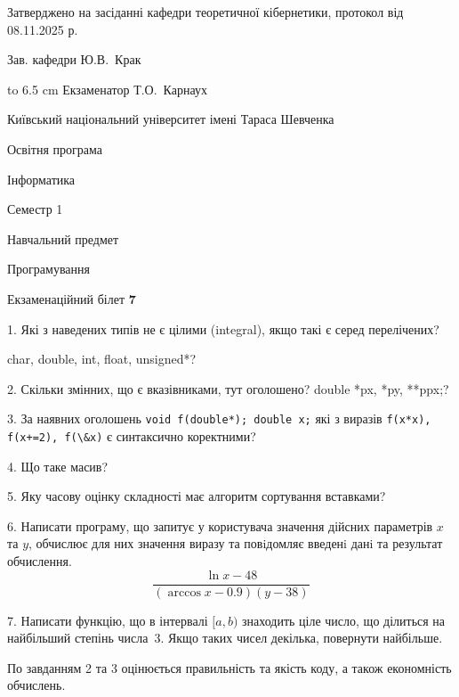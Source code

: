 \documentclass[12pt, ukrainian]{article}
\def\code#1{\Verb!#1!}
\begin{document}
{\smallskip\smallskip \begin {scriptsize} Затверджено на засіданні кафедри теоретичної кібернетики, протокол   від   08.11.2025 р.\par\smallskip\smallskip\smallskip\smallskip
{\parbox {6.5 cm} {Зав. кафедри \dotfill Ю.В.~Крак}}\hspace {0.7cm} {\hbox to 6.5 cm { Екзаменатор \dotfill Т.О.~Карнаух}} \end{scriptsize}}
\newpage
{{\begin {scriptsize}\par
{ \center  Київський національний університет імені Тараса Шевченка \par}
{\parbox {5 cm}{Освітня програма \hfill}{\parbox {7 cm}{Інформатика\hfill}}\parbox {6 cm}{\hfill Семестр 1}}\par
{\parbox {5 cm} {Навчальний предмет \hfill}\parbox {7 cm}{Програмування \hfill}\parbox {6cm}{\hfill}\par}\vspace{-15pt} \end{scriptsize}}{\center Екзаменаційний білет \No \textbf { 7 }\par}}
{%
1. Які з наведених типів не є цілими (integral), якщо такі є серед перелічених?

char, double, int, float, unsigned*?
\par
\vspace{2mm}
2. Скільки змінних, що є вказівниками, тут оголошено?
double *px, *py, **ppx;?
\par
\vspace{2mm}
3. За наявних оголошень \code{void f(double*); double x;} які з виразів \code{f(x*x), f(x+=2), f(\&x)} є синтаксично коректними?
\par
\vspace{2mm}
4. Що таке масив?
\par
\vspace{2mm}
5. Яку часову оцінку складності має алгоритм сортування вставками?
\par
\vspace{2mm}
6. Написати програму, що запитує у користувача значення дійсних параметрів $x$ та $y$, обчислює для них значення виразу та повiдомляє введенi данi та результат обчислення.
$$\frac{\ln x - 48}{(\arccos x - 0.9) (y - 38)}$$ 

\par
7. Написати функцію, що в інтервалі $[a, b)$ знаходить ціле число, що ділиться на найбільший степінь числа 3. Якщо таких чисел декілька, повернути найбільше.

По завданням 2 та 3 оцінюється правильність та якість коду, а також економність обчислень.

}
\end{document}
